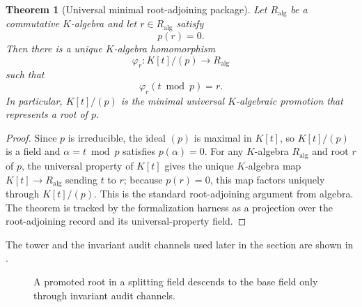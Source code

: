 \documentclass[11pt]{article}
\newcommand{\Gal}{\operatorname{Gal}}
\newcommand{\Tr}{\operatorname{Tr}}
\newcommand{\Nm}{\operatorname{Nm}}
\newtheorem{theorem}{Theorem}[section]
\theoremstyle{definition}
\begin{document}
\begin{theorem}[Universal minimal root-adjoining package]
\label{thm:gal-universal-root-adjoining}
Let \(R_{\mathrm{alg}}\) be a commutative \(K\)-algebra and let \(r\in R_{\mathrm{alg}}\) satisfy
\[
p(r)=0.
\]
Then there is a unique \(K\)-algebra homomorphism
\[
\varphi_r:K[t]/(p)\to R_{\mathrm{alg}}
\]
such that
\[
\varphi_r(t\bmod p)=r.
\]
In particular, \(K[t]/(p)\) is the minimal universal \(K\)-algebraic promotion that represents a root of \(p\).
\end{theorem}

\begin{proof}
Since \(p\) is irreducible, the ideal \((p)\) is maximal in \(K[t]\), so
\(K[t]/(p)\) is a field and \(\alpha=t\bmod p\) satisfies \(p(\alpha)=0\).
For any \(K\)-algebra \(R_{\mathrm{alg}}\) and root \(r\) of \(p\), the universal
property of \(K[t]\) gives the unique \(K\)-algebra map \(K[t]\to R_{\mathrm{alg}}\)
sending \(t\) to \(r\); because \(p(r)=0\), this map factors uniquely through
\(K[t]/(p)\).  This is the standard root-adjoining argument from algebra.  The
theorem is tracked by the formalization harness as a projection over the
root-adjoining record and its universal-property field.
\end{proof}

The tower and the invariant audit channels used later in the section are shown
in .

\begingroup\begin{figure}[tbp]
\centering
{}
\caption{A promoted root in a splitting field descends to the base field only through invariant audit channels.}
\label{fig:splitting-tower}
\end{figure}
 \endgroup
\end{document}
